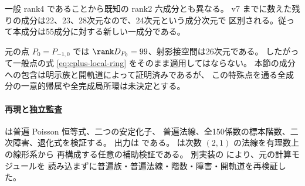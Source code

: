 一般 rank4 であることから既知の rank2 六成分とも異なる。
v7 までに数えた残りの成分は22、23、28次元なので、24次元という成分次元で
区別される。従って本成分は55成分に対する新しい一成分である。

元の点 $P_0=P_{-1,0}$ では $\rank D_{P_0}=99$、射影接空間は26次元である。
したがって一般点の式 \eqref{eq:cplus-local-ring} をそのまま適用してはならない。
本節の成分への包含は明示族と開軌道によって証明済みであるが、
この特殊点を通る全成分の一意的帰属や全完成局所環は未決定とする。

\paragraph{再現と独立監査}
 は普遍 Poisson 恒等式、二つの安定化子、
普遍法線、全150係数の標本階数、二次障害、退化式を検証する。
出力は  である。
 は次数 $(2,1)$ の法線を有理数上の線形系から
再構成する任意の補助検証である。
別実装の  により、元の計算モジュールを
読み込まずに普遍族・普遍法線・階数・障害・開軌道を再検証した。

